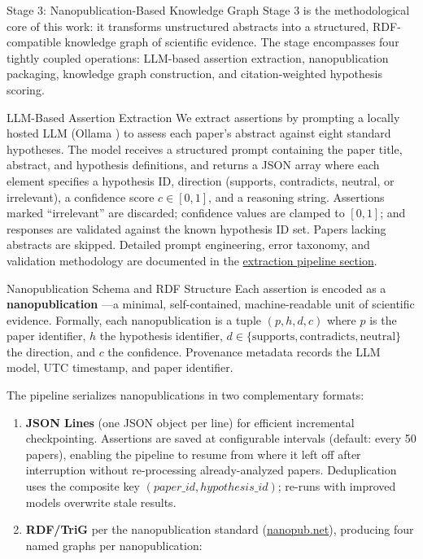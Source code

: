 \documentclass[
  ignorenonframetext,
]{beamer}
\author{\texorpdfstring{}{}}
\date{}
\begin{document}
\begin{frame}[fragile]{Stage 3: Nanopublication-Based Knowledge Graph
\label{sec:methods_kg}}
\protect{}\label{stage-3-nanopublication-based-knowledge-graph}
Stage 3 is the methodological core of this work: it transforms
unstructured abstracts into a structured, RDF-compatible knowledge graph
of scientific evidence. The stage encompasses four tightly coupled
operations: LLM-based assertion extraction, nanopublication packaging,
knowledge graph construction, and citation-weighted hypothesis scoring.

\begin{block}{LLM-Based Assertion Extraction}
\protect{}\label{llm-based-assertion-extraction}
We extract assertions by prompting a locally hosted LLM (Ollama
\citep{ollama2024}) to assess each paper's abstract against eight
standard hypotheses. The model receives a structured prompt containing
the paper title, abstract, and hypothesis definitions, and returns a
JSON array where each element specifies a hypothesis ID, direction
(supports, contradicts, neutral, or irrelevant), a confidence score
\(c \in [0, 1]\), and a reasoning string. Assertions marked
``irrelevant'' are discarded; confidence values are clamped to
\([0, 1]\); and responses are validated against the known hypothesis ID
set. Papers lacking abstracts are skipped. Detailed prompt engineering,
error taxonomy, and validation methodology are documented in the
\hyperref[sec:extraction_pipeline]{extraction pipeline section}.
\end{block}

\begin{block}{Nanopublication Schema and RDF Structure}
\protect{}\label{nanopublication-schema-and-rdf-structure}
Each assertion is encoded as a \textbf{nanopublication}
\citep{groth2010anatomy, kuhn2016decentralized}---a minimal,
self-contained, machine-readable unit of scientific evidence. Formally,
each nanopublication is a tuple \((p, h, d, c)\) where \(p\) is the
paper identifier, \(h\) the hypothesis identifier,
\(d \in \{\text{supports}, \text{contradicts}, \text{neutral}\}\) the
direction, and \(c\) the confidence. Provenance metadata records the LLM
model, UTC timestamp, and paper identifier.

The pipeline serializes nanopublications in two complementary formats:

\begin{enumerate}
\item
  \textbf{JSON Lines} (one JSON object per line) for efficient
  incremental checkpointing. Assertions are saved at configurable
  intervals (default: every 50 papers), enabling the pipeline to resume
  from where it left off after interruption without re-processing
  already-analyzed papers. Deduplication uses the composite key
  \((paper\_id, hypothesis\_id)\); re-runs with improved models
  overwrite stale results.
\item
  \textbf{RDF/TriG} per the nanopublication standard
  (\href{https://nanopub.net/}{nanopub.net}), producing four named
  graphs per nanopublication:
\end{enumerate}


\end{block}
\end{frame}
\end{document}
